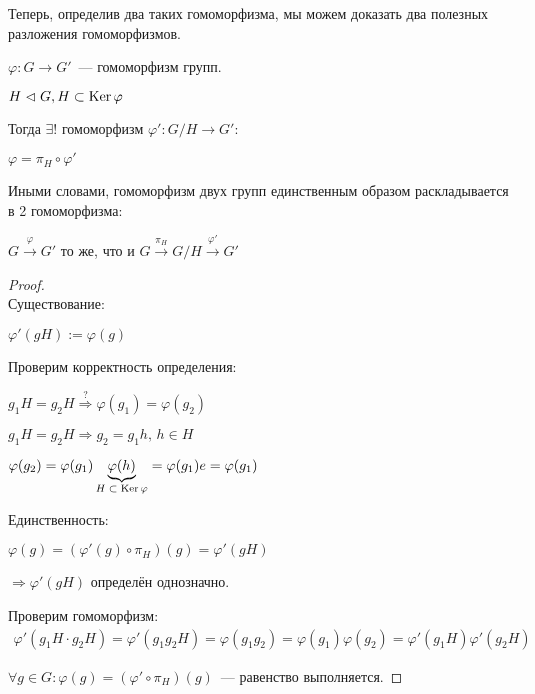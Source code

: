 Теперь, определив два таких гомоморфизма, мы можем доказать два полезных разложения гомоморфизмов. 

\begin{theorem-non}
    $\varphi: G \to G'$~--- гомоморфизм групп.

    $H \vartriangleleft G, H \subset \operatorname{Ker} \varphi$

    Тогда $\exists !$ гомоморфизм $\varphi': G/H \to G':$

    $\varphi = \pi_{H} \circ \varphi'$

    Иными словами, гомоморфизм двух групп единственным образом раскладывается в 2 гомоморфизма:

    $G \stackrel{\varphi}{\to} G'$ то же, что и $G \stackrel{\pi_{H}}{\to} G / H \stackrel{\varphi'}{\to} G'$

    \begin{proof}
        $ $ \\
        Существование:

        $\varphi'(gH) := \varphi(g)$

        Проверим корректность определения:

        $g_1H = g_2H \stackrel{?}{\Longrightarrow} \varphi(g_1) = \varphi(g_2)$
        
        $g_1H = g_2H \Longrightarrow g_2 = g_1h,\, h \in H$

        $\varphi(g_2) = \varphi(g_1)\underbrace{\varphi(h)}_{\text{$H \subset \operatorname{Ker} \varphi$}} = \varphi(g_1)e = \varphi(g_1)$

        Единственность:

        $\varphi(g) = (\varphi'(g) \circ \pi_{H})(g) = \varphi'(gH)$

        $\Longrightarrow \varphi'(gH)$ определён однозначно.

        Проверим гомоморфизм:
        \begin{gather*}
            \varphi'(g_1H \cdot g_2H) = \varphi'(g_1g_2H) = \varphi(g_1g_2) = \varphi(g_1)\varphi(g_2) = \varphi'(g_1H)\varphi'(g_2H)    
        \end{gather*}
        
        $\forall g \in G: \varphi(g) = (\varphi' \circ \pi_{H})(g)$~--- равенство выполняется.
    \end{proof}
\end{theorem-non}